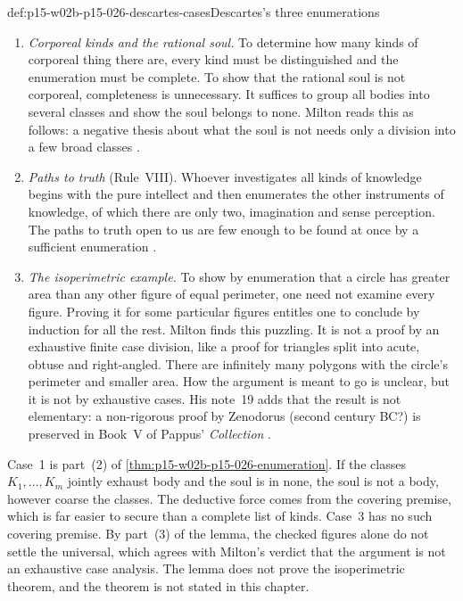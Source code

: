 \begin{hbexample}{def:p15-w02b-p15-026-descartes-cases}{Descartes's three enumerations}
\begin{enumerate}
\item \emph{Corporeal kinds and the rational soul.} To determine how many
  kinds of corporeal thing there are, every kind must be distinguished and
  the enumeration must be complete. To show that the rational soul is not
  corporeal, completeness is unnecessary. It suffices to group all bodies
  into several classes and show the soul belongs to none. Milton reads
  this as follows: a negative thesis about what the soul is not needs only
  a division into a few broad classes \cite[pp.~28--29]{Milton2011InductionBeforeHume}.
\item \emph{Paths to truth} (Rule~VIII). Whoever investigates all kinds of
  knowledge begins with the pure intellect and then enumerates the other
  instruments of knowledge, of which there are only two, imagination and
  sense perception. The paths to truth open to us are few enough to be
  found at once by a sufficient enumeration
  \cite[p.~29]{Milton2011InductionBeforeHume}.
\item \emph{The isoperimetric example.} To show by enumeration that a
  circle has greater area than any other figure of equal perimeter, one
  need not examine every figure. Proving it for some particular figures
  entitles one to conclude by induction for all the rest. Milton finds this
  puzzling. It is not a proof by an exhaustive finite case division, like a
  proof for triangles split into acute, obtuse and right-angled. There are
  infinitely many polygons with the circle's perimeter and smaller area.
  How the argument is meant to go is unclear, but it is not by exhaustive
  cases. His note~19 adds that the result is not elementary: a non-rigorous
  proof by Zenodorus (second century BC?) is preserved in Book~V of Pappus'
  \emph{Collection} \cite[p.~29]{Milton2011InductionBeforeHume}.
\end{enumerate}
\end{hbexample}

Case~1 is part~(2) of \cref{thm:p15-w02b-p15-026-enumeration}. If the
classes $K_1,\dots,K_m$ jointly exhaust body and the soul is in none, the
soul is not a body, however coarse the classes. The deductive force comes
from the covering premise, which is far easier to secure than a complete
list of kinds. Case~3 has no such covering premise. By part~(3) of the lemma,
the checked figures alone do not settle the universal, which agrees with
Milton's verdict that the argument is not an exhaustive case analysis. The
lemma does not prove the isoperimetric theorem, and the theorem is not
stated in this chapter.

